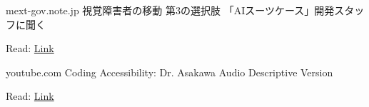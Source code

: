 \begin{cventries}
  \cventry
    {mext-gov.note.jp}
    {{\jpfont 視覚障害者の移動 第3の選択肢 「AIスーツケース」開発スタッフに聞く}}
    {}
    {}
    {
      \begin{cvitems}
        \item {Read: \href{https://mext-gov.note.jp/n/nf676373b0d8d}{Link}}
      \end{cvitems}
    }

  \cventry
    {youtube.com}
    {Coding Accessibility: Dr. Asakawa Audio Descriptive Version}
    {}
    {}
    {
      \begin{cvitems}
        \item {Read: \href{https://www.youtube.com/watch?v=kIgMb-PhhbQ}{Link}}
      \end{cvitems}
    }

\end{cventries}
